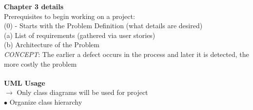 \documentclass[11pt]{article}
\begin{document}
    \textbf{Chapter 3 details}\\
    Prerequisites to begin working on a project:\\
    (0) - Starts with the Problem Definition (what details are desired)\\
    (a) List of requirements (gathered via user stories)\\
    (b) Architecture of the Problem\\
    

    \textit{CONCEPT}: The earlier a defect occurs in the process and later 
    it is detected, the more costly the problem\\
    \\
    \textbf{UML Usage}\\
    $\rightarrow$ Only class diagrams will be used for project\\
    \indent $\bullet$ Organize class hierarchy
\end{document}
